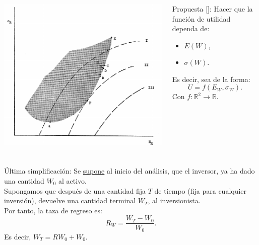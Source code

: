 \documentclass{beamer}
\begin{document}
\begin{frame}[t,fragile]
	\frametitle{\subsecname}
	\begin{columns}[t]
		\vfill 
		\includegraphics[width=  \linewidth]{IMAGES/1/2}
		\hspace{5mm}
		\begin{block}{\centering Propuesta \([\)\cite{sharpe}\(]\):}
		Hacer que la función de utilidad dependa de:
		\begin{itemize}
			\item \(E(W)\),
			\item \(\sigma (W)\).
		\end{itemize}
		\pause
		Es decir, sea de la forma:
		\[
			U = f(E_W, \sigma _W).
		\]
		Con \(f: \mathbb{R} ^2 \longrightarrow \mathbb{R}\).
	\end{block}
	\end{columns}
\end{frame}

\begin{frame}[t,fragile]
	\frametitle{\subsecname}
	\begin{block}{\centering Última simplificación:}
		Se \underline{supone} al inicio del análisis, que el inversor,
		ya ha dado una cantidad \(W_0\) al activo. \\[2mm]
		\pause
		Supongamos que después de una cantidad fija \(T\) de tiempo
		(fija para cualquier inversión), devuelve una cantidad terminal \(W_T\),
		al inversionista. \\[2mm]
		\pause
		Por tanto, la taza de regreso es:
		\[
			R_W = \dfrac{W_T - W_0}{W_0}.
		\]
		\pause
		Es decir, \(W_T = RW_0 + W_0\). \\ 
	\end{block}
\end{frame}
\end{document}
